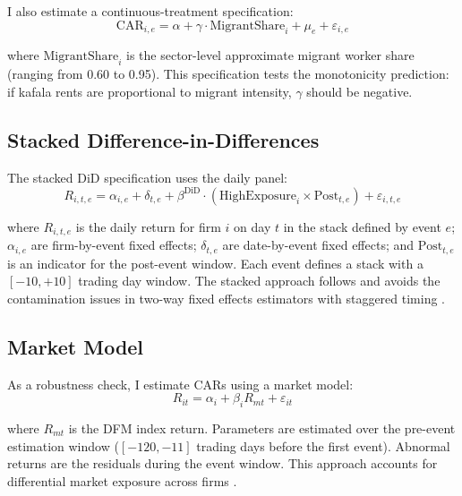\documentclass[12pt]{article}
\begin{document}
I also estimate a continuous-treatment specification:
\begin{equation}\label{eq:continuous}
    \text{CAR}_{i,e} = \alpha + \gamma \cdot \text{MigrantShare}_i + \mu_e + \varepsilon_{i,e}
\end{equation}

\noindent where $\text{MigrantShare}_i$ is the sector-level approximate migrant worker share (ranging from 0.60 to 0.95). This specification tests the monotonicity prediction: if kafala rents are proportional to migrant intensity, $\gamma$ should be negative.

\subsection{Stacked Difference-in-Differences}

The stacked DiD specification uses the daily panel:
\begin{equation}\label{eq:did}
    R_{i,t,e} = \alpha_{i,e} + \delta_{t,e} + \beta^{\text{DiD}} \cdot (\text{HighExposure}_i \times \text{Post}_{t,e}) + \varepsilon_{i,t,e}
\end{equation}

\noindent where $R_{i,t,e}$ is the daily return for firm $i$ on day $t$ in the stack defined by event $e$; $\alpha_{i,e}$ are firm-by-event fixed effects; $\delta_{t,e}$ are date-by-event fixed effects; and $\text{Post}_{t,e}$ is an indicator for the post-event window. Each event defines a stack with a $[-10, +10]$ trading day window. The stacked approach follows \citet{cengiz2019effect} and avoids the contamination issues in two-way fixed effects estimators with staggered timing \citep{callaway2021did}.

\subsection{Market Model}

As a robustness check, I estimate CARs using a market model:
\begin{equation}\label{eq:market}
    R_{it} = \alpha_i + \beta_i R_{mt} + \varepsilon_{it}
\end{equation}

\noindent where $R_{mt}$ is the DFM index return. Parameters are estimated over the pre-event estimation window ($[-120, -11]$ trading days before the first event). Abnormal returns are the residuals during the event window. This approach accounts for differential market exposure across firms \citep{mackinlay1997event, kothari2007econometrics}.
\end{document}
